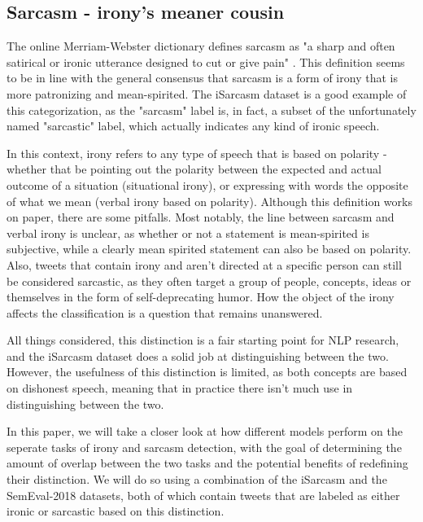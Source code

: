 \documentclass[10pt, a4paper]{article}
\begin{document}
\subsection{Sarcasm - irony's meaner cousin}\label{sec:sarcasm_definition}
The online Merriam-Webster dictionary defines sarcasm as "a sharp and often satirical or ironic utterance designed to 
cut or give pain" \citep{mw-dictionary}. This definition seems to be in line with the general consensus that sarcasm is
a form of irony that is more patronizing and mean-spirited. The iSarcasm dataset \citep{iSarcasm} is a good example of this 
categorization, as the "sarcasm" label is, in fact, a subset of the unfortunately named "sarcastic" label, which actually 
indicates any kind of ironic speech. 

In this context, irony refers to any type of speech that is based on polarity - whether that be pointing out the polarity 
between the expected and actual outcome of a situation (situational irony), or expressing with words the opposite of what 
we mean (verbal irony based on polarity). Although this definition works on paper, there are some pitfalls. Most notably, 
the line between sarcasm and verbal irony is unclear, as whether or not a statement is mean-spirited is subjective, while 
a clearly mean spirited statement can also be based on polarity. Also, tweets that contain irony and aren’t directed at a 
specific person can still be considered sarcastic, as they often target a group of people, concepts, ideas or themselves 
in the form of self-deprecating humor. How the object of the irony affects the classification is a question that remains unanswered.

All things considered, this distinction is a fair starting point for NLP research, and the iSarcasm \citep{iSarcasm} dataset
does a solid job at distinguishing between the two. However, the usefulness of this distinction is limited, as both concepts
are based on dishonest speech, meaning that in practice there isn't much use in distinguishing between the two.

In this paper, we will take a closer look at how different models perform on the seperate tasks of irony and sarcasm detection,
with the goal of determining the amount of overlap between the two tasks and the potential benefits of redefining their distinction.
We will do so using a combination of the iSarcasm \citep{iSarcasm} and the SemEval-2018 \citep{semeval-2018} 
datasets, both of which contain tweets that are labeled as either ironic or sarcastic based on this distinction.
\end{document}
